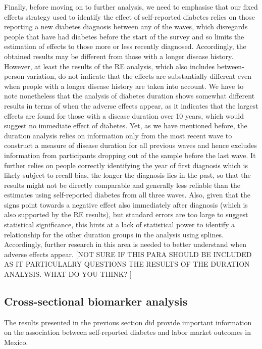 \documentclass[12pt,english,british]{article}
\begin{document}
Finally, before moving on to further analysis, we need to emphasise that our fixed effects strategy used to identify the effect of self-reported diabetes relies on those reporting a new diabetes diagnosis between any of the waves, which disregards people that have had diabetes before the start of the survey and so limits the estimation of effects to those more or less recently diagnosed. Accordingly, the obtained results may be different from those with a longer disease history. However, at least the results of the \ac{RE} analysis, which also includes between-person variation, do not indicate that the effects are substantially different even when people with a longer disease history are taken into account. We have to note nonetheless that the analysis of diabetes duration shows somewhat different results in terms of when the adverse effects appear, as it indicates that the largest effects are found for those with a disease duration over 10 years, which would suggest no immediate effect of diabetes. Yet, as we have mentioned before, the duration analysis relies on information only from the most recent wave to construct a measure of disease duration for all previous waves and hence excludes information from participants dropping out of the sample before the last wave. It further relies on people correctly identifying the year of first diagnosis which is likely subject to recall bias, the longer the diagnosis lies in the past, so that the results might not be directly comparable and generally less reliable than the estimates using self-reported diabetes from all three waves. Also, given that the signs point towards a negative effect also immediately after diagnosis (which is also supported by the \ac{RE} results), but standard errors are too large to suggest statistical significance, this hints at a lack of statistical power to identify a relationship for the other duration groups in the analysis using splines. Accordingly, further research in this area is needed to better understand when adverse effects appear. [NOT SURE IF THIS PARA SHOULD BE INCLUDED AS IT PARTICULALRY QUESTIONS THE RESULTS OF THE DURATION ANALYSIS. WHAT DO YOU THINK? ]
  

\subsection{Cross-sectional biomarker analysis}

The results presented in the previous section did provide important
information on the association between self-reported diabetes and
labor market outcomes in Mexico.
\end{document}
